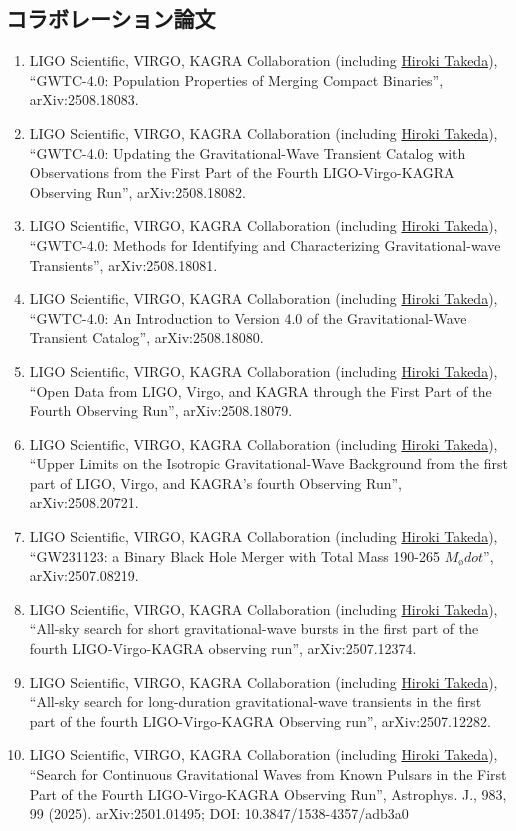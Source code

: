 \documentclass[uplatex, 11pt]{jsarticle}
\begin{document}
\subsection*{コラボレーション論文}
\begin{enumerate}
\item LIGO Scientific, VIRGO, KAGRA Collaboration (including \uline{Hiroki Takeda}), “GWTC-4.0: Population Properties of Merging Compact Binaries”, arXiv:2508.18083.
\item LIGO Scientific, VIRGO, KAGRA Collaboration (including \uline{Hiroki Takeda}), “GWTC-4.0: Updating the Gravitational-Wave Transient Catalog with Observations from the First Part of the Fourth LIGO-Virgo-KAGRA Observing Run”, arXiv:2508.18082.
\item LIGO Scientific, VIRGO, KAGRA Collaboration (including \uline{Hiroki Takeda}), “GWTC-4.0: Methods for Identifying and Characterizing Gravitational-wave Transients”, arXiv:2508.18081.
\item LIGO Scientific, VIRGO, KAGRA Collaboration (including \uline{Hiroki Takeda}), “GWTC-4.0: An Introduction to Version 4.0 of the Gravitational-Wave Transient Catalog”, arXiv:2508.18080.
\item LIGO Scientific, VIRGO, KAGRA Collaboration (including \uline{Hiroki Takeda}), “Open Data from LIGO, Virgo, and KAGRA through the First Part of the Fourth Observing Run”, arXiv:2508.18079.
\item LIGO Scientific, VIRGO, KAGRA Collaboration (including \uline{Hiroki Takeda}), “Upper Limits on the Isotropic Gravitational-Wave Background from the first part of LIGO, Virgo, and KAGRA's fourth Observing Run”, arXiv:2508.20721.
\item LIGO Scientific, VIRGO, KAGRA Collaboration (including \uline{Hiroki Takeda}), “GW231123: a Binary Black Hole Merger with Total Mass 190-265 $M_ødot$”, arXiv:2507.08219.
\item LIGO Scientific, VIRGO, KAGRA Collaboration (including \uline{Hiroki Takeda}), “All-sky search for short gravitational-wave bursts in the first part of the fourth LIGO-Virgo-KAGRA observing run”, arXiv:2507.12374.
\item LIGO Scientific, VIRGO, KAGRA Collaboration (including \uline{Hiroki Takeda}), “All-sky search for long-duration gravitational-wave transients in the first part of the fourth LIGO-Virgo-KAGRA Observing run”, arXiv:2507.12282.
\item LIGO Scientific, VIRGO, KAGRA Collaboration (including \uline{Hiroki Takeda}), “Search for Continuous Gravitational Waves from Known Pulsars in the First Part of the Fourth LIGO-Virgo-KAGRA Observing Run”, Astrophys. J., 983, 99 (2025). arXiv:2501.01495; DOI: 10.3847/1538-4357/adb3a0

\end{enumerate}
\end{document}
